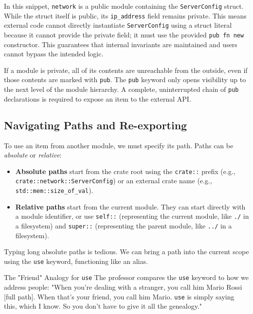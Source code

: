 In this snippet, \texttt{network} is a public module containing the \texttt{ServerConfig} struct. While the struct itself is public, its \texttt{ip\_address} field remains private. This means external code cannot directly instantiate \texttt{ServerConfig} using a struct literal because it cannot provide the private field; it must use the provided \texttt{pub fn new} constructor. This guarantees that internal invariants are maintained and users cannot bypass the intended logic.

\begin{notebox}
If a module is private, all of its contents are unreachable from the outside, even if those contents are marked with \texttt{pub}. The \texttt{pub} keyword only opens visibility up to the next level of the module hierarchy. A complete, uninterrupted chain of \texttt{pub} declarations is required to expose an item to the external API.
\end{notebox}

\subsection{Navigating Paths and Re-exporting}

To use an item from another module, we must specify its path. Paths can be \textit{absolute} or \textit{relative}:
\begin{itemize}
    \item \textbf{Absolute paths} start from the crate root using the \texttt{crate::} prefix (e.g., \texttt{crate::network::ServerConfig}) or an external crate name (e.g., \texttt{std::mem::size\_of\_val}).
    \item \textbf{Relative paths} start from the current module. They can start directly with a module identifier, or use \texttt{self::} (representing the current module, like \texttt{./} in a filesystem) and \texttt{super::} (representing the parent module, like \texttt{../} in a filesystem).
\end{itemize}

Typing long absolute paths is tedious. We can bring a path into the current scope using the \texttt{use} keyword, functioning like an alias.

\begin{insightbox}{The "Friend" Analogy for \texttt{use}}
The professor compares the \texttt{use} keyword to how we address people: "When you're dealing with a stranger, you call him Mario Rossi [full path]. When that's your friend, you call him Mario. \texttt{use} is simply saying this, which I know. So you don't have to give it all the genealogy."
\end{insightbox}


